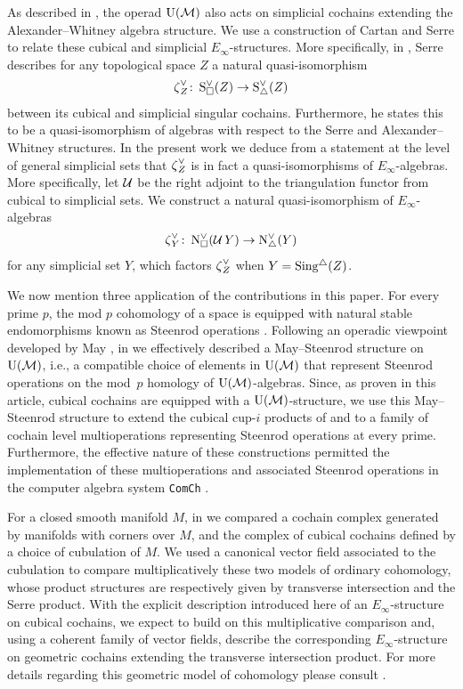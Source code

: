 As described in \cite{medina2020prop1}, the operad ${\operatorname{U}(\mathcal{M})}$ also acts on simplicial cochains extending the Alexander--Whitney algebra structure.
We use a construction of Cartan and Serre to relate these cubical and simplicial $E_\infty$-structures.
More specifically, in \cite[p. 442]{serre1951homologie}, Serre describes for any topological space $Z$ a natural quasi-isomorphism
\[
\operatorname{\zeta}_Z^\vee \colon \operatorname{S^{\vee}_{\square}}(Z) \to \operatorname{S^{\vee}_{\triangle}}(Z)
\]
between its cubical and simplicial singular cochains.
Furthermore, he states this to be a quasi-isomorphism of algebras with respect to the Serre and Alexander--Whitney structures.
In the present work we deduce from a statement at the level of general simplicial sets that $\operatorname{\zeta}_Z^\vee$ is in fact a quasi-isomorphisms of $E_\infty$-algebras.
More specifically, let $\operatorname{\mathcal{U}}$ be the right adjoint to the triangulation functor from cubical to simplicial sets.
We construct a natural quasi-isomorphism of $E_\infty$-algebras
\[
\operatorname{\zeta}_Y^\vee \colon \operatorname{N^{\vee}_{\square}}(\operatorname{\mathcal{U}} Y) \to \operatorname{N^{\vee}_{\triangle}}(Y)
\]
for any simplicial set $Y$, which factors $\operatorname{\zeta}_Z^\vee$ when $Y = \operatorname{Sing^{\triangle}}(Z)$.

We now mention three application of the contributions in this paper.
For every prime $p$, the mod $p$ cohomology of a space is equipped with natural stable endomorphisms known as Steenrod operations \cite{steenrod1962cohomology}.
Following an operadic viewpoint developed by May \cite{may1970general}, in \cite{medina2021may_st} we effectively described a May--Steenrod structure on ${\operatorname{U}(\mathcal{M})}$, i.e., a compatible choice of elements in ${\operatorname{U}(\mathcal{M})}$ that represent Steenrod operations on the mod~$p$ homology of ${\operatorname{U}(\mathcal{M})}$-algebras.
Since, as proven in this article, cubical cochains are equipped with a ${\operatorname{U}(\mathcal{M})}$-structure, we use this May--Steenrod structure to extend the cubical cup-$i$ products of \cite{kadeishvili1999coproducts} and \cite{pilarczyk2016cubical} to a family of cochain level multioperations representing Steenrod operations at every prime.
Furthermore, the effective nature of these constructions permitted the implementation of these multioperations and associated Steenrod operations in the computer algebra system \texttt{ComCh} \cite{medina2021comch}.

For a closed smooth manifold $M$, in \cite{medina2021flowing} we compared a cochain complex generated by manifolds with corners over $M$, and the complex of cubical cochains defined by a choice of cubulation of $M$.
We used a canonical vector field associated to the cubulation to compare multiplicatively these two models of ordinary cohomology, whose product structures are respectively given by transverse intersection and the Serre product.
With the explicit description introduced here of an $E_\infty$-structure on cubical cochains, we expect to build on this multiplicative comparison and, using a coherent family of vector fields, describe the corresponding $E_\infty$-structure on geometric cochains extending the transverse intersection product.
For more details regarding this geometric model of cohomology please consult \cite{medina2022foundations}.

